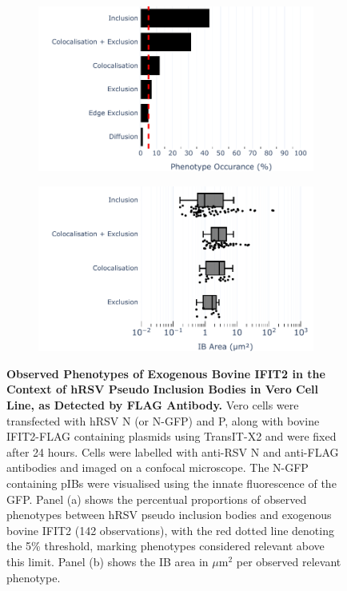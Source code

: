 \begin{figure}
    \begin{subfigure}{0.495\textwidth}
        \caption{}
        \includegraphics[width=1\linewidth]{09. Chapter 4/Figs/01. pIB/03. IFIT2/04. IFIT2-FLAG/03. FLAG/04. bar_bi2f_hnhp.pdf} 
    \end{subfigure}
    \begin{subfigure}{0.495\textwidth}
        \caption{}
        \includegraphics[width=1\linewidth]{09. Chapter 4/Figs/01. pIB/03. IFIT2/04. IFIT2-FLAG/03. FLAG/05. box_bi2f_hnhp.pdf}
    \end{subfigure}
    \caption[Observed Phenotypes of Exogenous Bovine IFIT2 in the Context of hRSV Pseudo Inclusion Bodies in Vero Cell Line, as Detected by FLAG Antibody.]{\textbf{Observed Phenotypes of Exogenous Bovine IFIT2 in the Context of hRSV Pseudo Inclusion Bodies in Vero Cell Line, as Detected by FLAG Antibody.} Vero cells were transfected with hRSV N (or N-GFP) and P, along with bovine IFIT2-FLAG containing plasmids using TransIT-X2 and were fixed after 24 hours. Cells were labelled with anti-RSV N and anti-FLAG antibodies and imaged on a confocal microscope. The N-GFP containing pIBs were visualised using the innate fluorescence of the GFP. Panel (a) shows the percentual proportions of observed phenotypes between hRSV pseudo inclusion bodies and exogenous bovine IFIT2 (142 observations), with the red dotted line denoting the 5\% threshold, marking phenotypes considered relevant above this limit. Panel (b) shows the IB area in \(\mu \mbox{m}^2\) per observed relevant phenotype.}
    \label{fig:Observed Phenotypes of Exogenous Bovine IFIT2 in the Context of hRSV Pseudo Inclusion Bodies in Vero Cell Line, as Detected by FLAG Antibody}
\end{figure}

